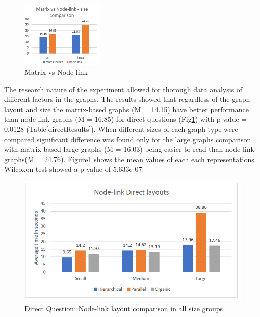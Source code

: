 \documentclass{l4proj}
\begin{document}
\begin{figure}
	\centering
	\vspace{-20mm}
    \includegraphics[width=0.35\textwidth]{images/directComparison.PNG}
    \caption{Matrix vs Node-link} 
	\label{directComparison}
\end{figure}


The research nature of the experiment allowed for thorough data analysis of different factors in the graphs. The results showed that regardless of the graph layout and size the matrix-based graphs (M = 14.15) have better performance than node-link graphs (M = 16.85) for direct questions (Fig\ref{directComparison}) with p-value = 0.0128 (Table\ref{directResults}). When different sizes of each graph type were compared significant difference was found only for the large graphs comparison with matrix-based large graphs (M = 16.03) being easier to read than node-link graphs(M = 24.76). Figure\ref{directComparison} shows the mean values of each each representations. Wilcoxon test showed a p-value of 5.633e-07.


\begin{figure}[!ht]
    \includegraphics[width=13cm]{images/nodelinkdirectlayouts.PNG}
    \vspace{-15pt}
    \centering
    \caption{Direct Question: Node-link layout comparison in all size groups}
	\label{nodelinkdirectlayouts}
\end{figure}
\end{document}
